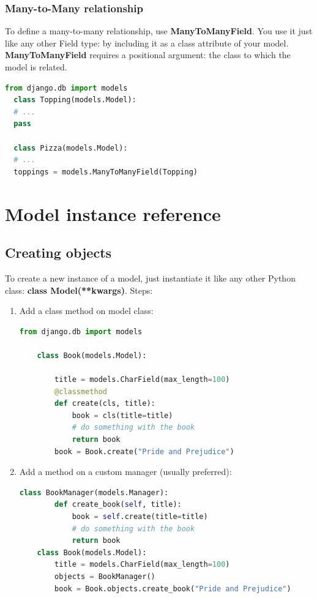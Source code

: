 \subsubsection{Many-to-Many relationship}
To define a many-to-many relationship, use \textbf{ManyToManyField}. You use it just like any other Field type: by including it as a class attribute of your model.
\textbf{ManyToManyField} requires a positional argument: the class to which the model is related.
\begin{lstlisting}[language=python,numbers=none]
  from django.db import models
  class Topping(models.Model):
  # ...
  pass
  
  class Pizza(models.Model):
  # ...
  toppings = models.ManyToManyField(Topping)
\end{lstlisting}

\newpage

\section{Model instance reference}
\subsection{Creating objects}
To create a new instance of a model, just instantiate it like any other Python class:
\textbf{class Model(**kwargs)}.
Steps:
\begin{enumerate}
	\item Add a class method on model class:
	\begin{lstlisting}[language=python,numbers=none]
	from django.db import models
	
	class Book(models.Model):
	
		title = models.CharField(max_length=100)
		@classmethod
		def create(cls, title):
			book = cls(title=title)
			# do something with the book
			return book
		book = Book.create("Pride and Prejudice")
	\end{lstlisting}
	\item  Add a method on a custom manager (usually preferred):
	\begin{lstlisting}[language=python,numbers=none]
	class BookManager(models.Manager):
		def create_book(self, title):
			book = self.create(title=title)
			# do something with the book
			return book
	class Book(models.Model):
		title = models.CharField(max_length=100)
		objects = BookManager()
		book = Book.objects.create_book("Pride and Prejudice")
	\end{lstlisting}
\end{enumerate}
